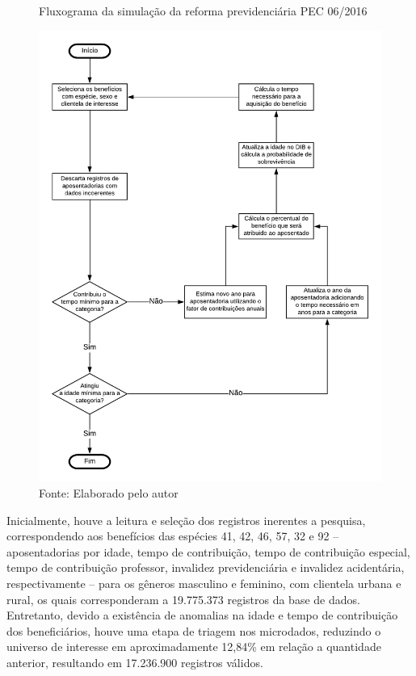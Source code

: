 \begin{figure}[!h]
    \centering
    \caption{Fluxograma da simulação da reforma previdenciária PEC 06/2016}
    \includegraphics[width=\textwidth]{figs/cap05_fluxograma_reforma_previdencia.pdf}
    \caption*{\footnotesize{Fonte: Elaborado pelo autor}}
    \label{fig:cap05:fluxograma}
\end{figure}

\newpage

Inicialmente, houve a leitura e seleção dos registros inerentes a pesquisa, correspondendo aos benefícios das espécies 41, 42, 46, 57, 32 e 92 – aposentadorias por idade, tempo de contribuição, tempo de contribuição especial, tempo de contribuição professor, invalidez previdenciária e invalidez acidentária, respectivamente – para os gêneros masculino e feminino, com clientela urbana e rural, os quais corresponderam a 19.775.373 registros da base de dados. Entretanto, devido a existência de anomalias na idade e tempo de contribuição dos beneficiários, houve uma etapa de triagem nos microdados, reduzindo o universo de interesse em aproximadamente 12,84\% em relação a quantidade anterior, resultando em 17.236.900 registros válidos. 

